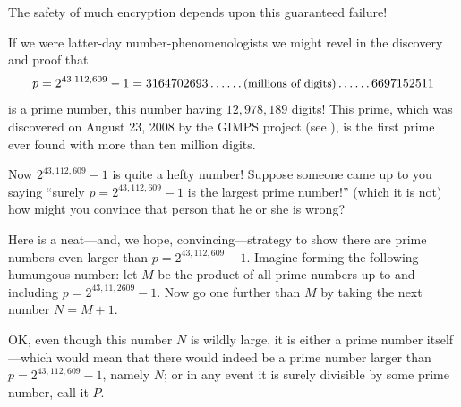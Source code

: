 \documentclass[openany]{book}
\theoremstyle{plain}
\theoremstyle{definition}
\begin{document}




The safety of much
encryption depends upon this guaranteed failure! 

If we were latter-day number-phenomenologists we might revel in the
discovery and proof that
$$
  p=2^{43,112,609}-1 = 3164702693\ldots\ldots\text{\small (millions of digits)}\ldots\ldots6697152511
$$ 
is a prime number, this number having $12,\!978,\!189$ digits!  This
prime, which was discovered on August 23, 2008 by the GIMPS project
(see ), 
is the first prime ever found with more than ten million digits.

Now $2^{43,112,609}-1$ is quite a hefty number! Suppose someone came
up to you saying ``surely $p = 2^{43,112,609}-1$ is the largest prime
number!'' (which it is not) how might you convince that person that
he or she is wrong?


Here is a neat---and, we hope, convincing---strategy to show there are
prime numbers even larger than $p = 2^{43,112,609} - 1$. Imagine
forming the following humungous number: let $M$ be the product of all
prime numbers up to and including $p = 2^{43,11,2609} - 1$.  Now go
one further than $M$ by taking the next number $N=M+1$.
 

OK, even though this number $N$ is wildly large, it is either a prime
number itself---which would mean that there would indeed be a prime
number larger than $p=2^{43,112,609} - 1$, namely $N$; or in any event it is
surely divisible by some prime number, call it $P$.
\end{document}
